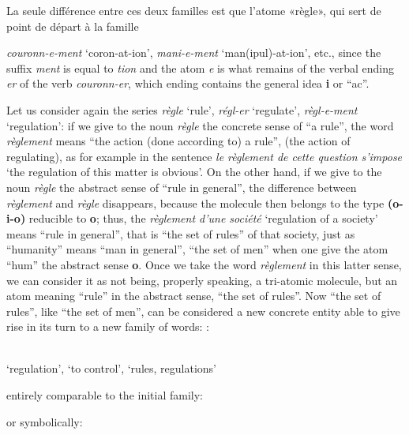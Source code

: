 \begin{sloppypar}
{{    La seule différence entre ces deux familles est que l’atome
    «règle», qui sert de point de départ à la famille}
  
}
% 
{\noindent
  {\small
    \emph{couronn-e-ment} `coron-at-ion', \emph{mani-e-ment}
    `man(ipul)-at-ion', etc., since the suffix \emph{ment} is equal to
    \emph{tion} and the atom \emph{e} is what remains of the verbal ending
    \emph{er} of the verb \emph{couronn-er}, which ending contains the
    general idea \textbf{i} or ``ac''.

    Let us consider again the series \emph{règle} `rule', \emph{régl-er}
    `regulate', \emph{règl-e-ment} `regulation': if we give to the noun
    \emph{règle} the concrete sense of ``a rule'', the word
    \emph{règlement} means ``the action (done according to) a rule'',
    (the action of regulating), as for example in the sentence \emph{le
    règlement de cette question s'impose} `the regulation of this
    matter is obvious'. On the other hand, if we give to the noun
    \emph{règle} the abstract sense of ``rule in general'', the
    difference between \emph{règlement} and \emph{règle} disappears,
    because the molecule then belongs to the type \textbf{(o-i-o)}
    reducible to \textbf{o}; thus, the \emph{règlement d'une
    société} `regulation of a society' means ``rule in general'',
    that is ``the set of rules'' of that society, just as ``humanity''
    means ``man in general'', ``the set of men'' when one give the
    atom ``hum'' the abstract sense \textbf{o}. Once we take the word
    \emph{règlement} in this latter sense, we can consider it as not
    being, properly speaking, a tri-atomic molecule, but an atom
    meaning ``rule'' in the abstract sense, ``the set of rules''. Now
    ``the set of rules'', like ``the set of men'', can be considered a
    new concrete entity able to give rise in its turn to a new family
    of words: :

    \begin{center}
      \\
      `regulation', `to control', `rules, regulations'
    \end{center}
    entirely comparable to the initial family:

    \begin{center}
    \end{center}
    or symbolically:

}}
\end{sloppypar}
